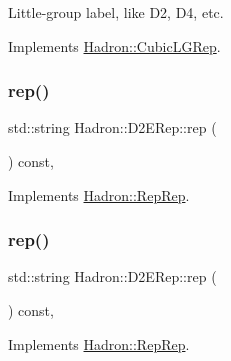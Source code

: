 Little-\/group label, like D2, D4, etc. 

Implements \mbox{\hyperlink{structHadron_1_1CubicLGRep_a9bdb14b519a611d21379ed96a3a9eb41}{Hadron\+::\+Cubic\+L\+G\+Rep}}.

\mbox{\label{structHadron_1_1D2ERep_a5fbd82820d3cde321d9208b7208873fb}} 
\subsubsection{\texorpdfstring{rep()}{rep()}\hspace{0.1cm}{\footnotesize\ttfamily [1/5]}}
{\footnotesize\ttfamily std\+::string Hadron\+::\+D2\+E\+Rep\+::rep (\begin{DoxyParamCaption}{ }\end{DoxyParamCaption}) const\hspace{0.3cm}{\ttfamily [inline]}, {\ttfamily [virtual]}}



Implements \mbox{\hyperlink{structHadron_1_1RepRep_ab3213025f6de249f7095892109575fde}{Hadron\+::\+Rep\+Rep}}.

\mbox{\label{structHadron_1_1D2ERep_a5fbd82820d3cde321d9208b7208873fb}} 
\subsubsection{\texorpdfstring{rep()}{rep()}\hspace{0.1cm}{\footnotesize\ttfamily [2/5]}}
{\footnotesize\ttfamily std\+::string Hadron\+::\+D2\+E\+Rep\+::rep (\begin{DoxyParamCaption}{ }\end{DoxyParamCaption}) const\hspace{0.3cm}{\ttfamily [inline]}, {\ttfamily [virtual]}}



Implements \mbox{\hyperlink{structHadron_1_1RepRep_ab3213025f6de249f7095892109575fde}{Hadron\+::\+Rep\+Rep}}.

\mbox{\label{structHadron_1_1D2ERep_a5fbd82820d3cde321d9208b7208873fb}} 
